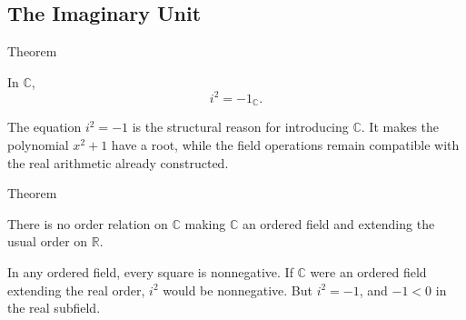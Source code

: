\subsection*{The Imaginary Unit}

\begin{theorembox}{Theorem}
\begin{theorem}
\label{thm:i-squared-negative-one}
In \(\mathbb{C}\),
\[
i^2=-1_{\mathbb{C}}.
\]
\end{theorem}
\end{theorembox}

\begin{remark*}[Interpretation]
The equation \(i^2=-1\) is the structural reason for introducing
\(\mathbb{C}\). It makes the polynomial \(x^2+1\) have a root, while the field
operations remain compatible with the real arithmetic already constructed.
\end{remark*}

\begin{theorembox}{Theorem}
\begin{theorem}
\label{thm:c-is-not-an-ordered-field}
There is no order relation on \(\mathbb{C}\) making \(\mathbb{C}\) an ordered
field and extending the usual order on \(\mathbb{R}\).
\end{theorem}
\end{theorembox}

\begin{remark*}[Reason]
In any ordered field, every square is nonnegative. If \(\mathbb{C}\) were an
ordered field extending the real order, \(i^2\) would be nonnegative. But
\(i^2=-1\), and \(-1<0\) in the real subfield.
\end{remark*}
